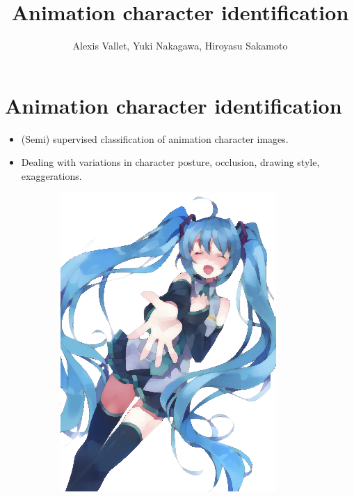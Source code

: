 \documentclass{beamer}
\title{Animation character identification}
\author{Alexis Vallet, Yuki Nakagawa, Hiroyasu Sakamoto}
\institute{Kyushu University, University of Technology of Belfort-Montbéliard}
\begin{document}
\frame{\titlepage}

\section{Animation character identification}

\begin{frame}
\begin{itemize}
\item (Semi) supervised classification of animation character images.
\item Dealing with variations in character posture, occlusion, drawing style, exaggerations.
\end{itemize}

\begin{figure}[htb!]
\centering
\begin{subfigure}{.3\textwidth}
\includegraphics[width=\textwidth]{../images/miku_e.png}

\end{subfigure}
\end{figure}
\end{frame}
\end{document}
